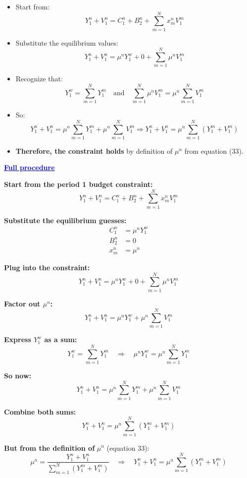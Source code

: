 \documentclass[12pt]{article}
\begin{document}
\begin{itemize}
\begin{itemize}
    \item Start from:
    \[
    Y_1^n + V_1^n = C_1^n + B_2^n + \sum_{m=1}^{N} x_m^n V_1^m
    \]

    \item Substitute the equilibrium values:
    \[
    Y_1^n + V_1^n = \mu^n Y_1^w + 0 + \sum_{m=1}^{N} \mu^n V_1^m
    \]

    \item Recognize that:
    \[
    Y_1^w = \sum_{m=1}^{N} Y_1^m
    \quad \text{and} \quad
    \sum_{m=1}^{N} \mu^n V_1^m = \mu^n \sum_{m=1}^{N} V_1^m
    \]

    \item So:
    \[
    Y_1^n + V_1^n = \mu^n \sum_{m=1}^{N} Y_1^m + \mu^n \sum_{m=1}^{N} V_1^m
    \Rightarrow Y_1^n + V_1^n = \mu^n \sum_{m=1}^{N} (Y_1^m + V_1^m)
    \]

    \item \textbf{Therefore, the constraint holds} by definition of \( \mu^n \) from equation (33).
\end{itemize}

\textcolor{blue}{\textbf{\uline{Full procedure}}}

{\color{blue}
\textbf{Start from the period 1 budget constraint:}
\[
Y_1^n + V_1^n = C_1^n + B_2^n + \sum_{m=1}^{N} x_m^n V_1^m
\]

\textbf{Substitute the equilibrium guesses:}
\begin{align*}
C_1^n &= \mu^n Y_1^w \\
B_2^n &= 0 \\
x_m^n &= \mu^n
\end{align*}

\textbf{Plug into the constraint:}
\[
Y_1^n + V_1^n = \mu^n Y_1^w + 0 + \sum_{m=1}^{N} \mu^n V_1^m
\]

\textbf{Factor out \( \mu^n \):}
\[
Y_1^n + V_1^n = \mu^n Y_1^w + \mu^n \sum_{m=1}^{N} V_1^m
\]

\textbf{Express \( Y_1^w \) as a sum:}
\[
Y_1^w = \sum_{m=1}^{N} Y_1^m
\quad \Rightarrow \quad
\mu^n Y_1^w = \mu^n \sum_{m=1}^{N} Y_1^m
\]

\textbf{So now:}
\[
Y_1^n + V_1^n = \mu^n \sum_{m=1}^{N} Y_1^m + \mu^n \sum_{m=1}^{N} V_1^m
\]

\textbf{Combine both sums:}
\[
Y_1^n + V_1^n = \mu^n \sum_{m=1}^{N} (Y_1^m + V_1^m)
\]

\textbf{But from the definition of } \( \mu^n \) (equation 33):
\[
\mu^n = \frac{Y_1^n + V_1^n}{\sum_{m=1}^{N}(Y_1^m + V_1^m)}
\quad \Rightarrow \quad
Y_1^n + V_1^n = \mu^n \sum_{m=1}^{N}(Y_1^m + V_1^m)
\]

}
\end{itemize}
\end{document}
